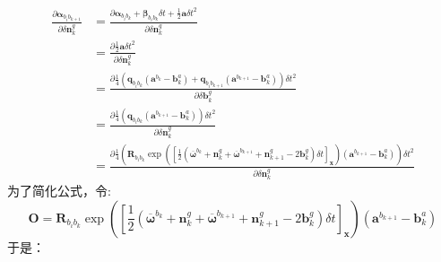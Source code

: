 \documentclass[oneside]{article}
\begin{document}
\begin{align}
    \frac{\partial \boldsymbol{\alpha}_{b_{i} b_{k+1}}}{\partial \delta \mathbf{n}_{k}^{g}}    
 &= \frac{\partial\boldsymbol{\alpha}_{b_{i} b_{k}}+\boldsymbol{\beta}_{b_{i} b_{k}} \delta t+\frac{1}{2} \mathbf{a} \delta t^{2}}{\partial \delta \mathbf{n}_{k}^{g}} \\
 &= \frac{\partial\frac{1}{2} \mathbf{a} \delta t^{2}}{\partial \delta \mathbf{n}_{k}^{g}} \\
 &= \frac{\partial\frac{1}{4}\left(\mathbf{q}_{b_{i} b_{k}}\left({\mathbf{a}}^{b_{k}}-\mathbf{b}_{k}^{a}\right)+\mathbf{q}_{b_{i} b_{k+1}}\left({\mathbf{a}}^{b_{k+1}}-\mathbf{b}_{k}^{a}\right)\right) \delta t^2}{\partial \delta \mathbf{b}_{k}^{g}} \\
 &= \frac{\partial\frac{1}{4}\left(\mathbf{q}_{b_{i} b_{k}}\left({\mathbf{a}}^{b_{k+1}}-\mathbf{b}_{k}^{a}\right)\right) \delta t^2}{\partial \delta \mathbf{n}_{k}^{g}} \\
 &= \frac{\partial\frac{1}{4}\left(\mathbf{R}_{b_{i} b_{k}}
\exp \left( \left[ \frac{1}{2}(\mathbf{\overline{\omega}}^{b_k} + \mathbf{n}_k^g + \mathbf{\overline{\omega}}^{b_{k + 1}} + \mathbf{n}_{k+1}^g- 2\mathbf{b}_k^g) \delta t \right]_{\mathbf{x}} \right)
 \left({\mathbf{a}}^{b_{k+1}}-\mathbf{b}_{k}^{a}\right)\right) \delta t^2}{\partial \delta \mathbf{n}_{k}^{g}} 
\end{align} 
为了简化公式，令:
\begin{equation}
    \mathbf{O} = \mathbf{R}_{b_{i} b_{k}}
    \exp \left( \left[ \frac{1}{2}(\mathbf{\overline{\omega}}^{b_k} + \mathbf{n}_k^g + \mathbf{\overline{\omega}}^{b_{k + 1}} + \mathbf{n}_{k+1}^g- 2\mathbf{b}_k^g) \delta t \right]_{\mathbf{x}} \right)
     \left({\mathbf{a}}^{b_{k+1}}-\mathbf{b}_{k}^{a}\right)  
\end{equation}
于是：
\end{document}
